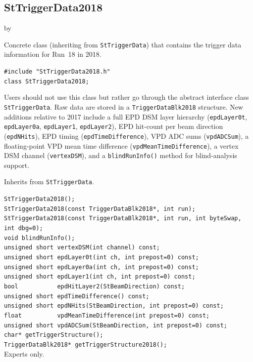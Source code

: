 \documentclass[twoside]{article}
\newcommand{\entrylabel}[1]{\mbox{\textbf{{#1}}}\hfil}%
\newenvironment{entry}
{\begin{list}{}%
    {\renewcommand{\makelabel}{\entrylabel}%
     \setlength{\labelwidth}{90pt}%
     \setlength{\leftmargin}{\labelwidth}
     \advance\leftmargin by \labelsep%
      }%
    }%
  {\end{list}}
\newcommand{\Entrylabel}[1]%
{\raisebox{0pt}[1ex][0pt]{\makebox[\labelwidth][l]%
    {\parbox[t]{\labelwidth}{\hspace{0pt}\textbf{{#1}}}}}}
\newenvironment{Entry}%
{\renewcommand{\entrylabel}{\Entrylabel}\begin{entry}}%
  {\end{entry}}
\begin{document}
\subsection{StTriggerData2018}
\label{sec:StTriggerData2018}
\begin{Entry}
\item[Summary] Concrete class (inheriting from \texttt{StTriggerData}) that
    contains the trigger data information for Run~18 in 2018.
\item[Synopsis]
    \verb+#include "StTriggerData2018.h"+\\
    \verb+class StTriggerData2018;+\\
\item[Description] Users should not use this class but rather go through the
    abstract interface class \texttt{StTriggerData}.  Raw data are stored in a
    \verb+TriggerDataBlk2018+ structure.  New additions relative to 2017 include
    a full EPD DSM layer hierarchy (\verb+epdLayer0t+, \verb+epdLayer0a+,
    \verb+epdLayer1+, \verb+epdLayer2+), EPD hit-count per beam direction
    (\verb+epdNHits+), EPD timing (\verb+epdTimeDifference+), VPD ADC sums
    (\verb+vpdADCSum+), a floating-point VPD mean time difference
    (\verb+vpdMeanTimeDifference+), a vertex DSM channel (\verb+vertexDSM+),
    and a \verb+blindRunInfo()+ method for blind-analysis support.
\item[Related Classes] Inherits from \texttt{StTriggerData}.
\item[Public\\ Constructors]
    \verb+StTriggerData2018();+\\
    \verb+StTriggerData2018(const TriggerDataBlk2018*, int run);+\\
    \verb+StTriggerData2018(const TriggerDataBlk2018*, int run, int byteSwap, int dbg=0);+\\
    \verb+void blindRunInfo();+\\
    \verb+unsigned short vertexDSM(int channel) const;+\\
    \verb+unsigned short epdLayer0t(int ch, int prepost=0) const;+\\
    \verb+unsigned short epdLayer0a(int ch, int prepost=0) const;+\\
    \verb+unsigned short epdLayer1(int ch, int prepost=0) const;+\\
    \verb+bool           epdHitLayer2(StBeamDirection) const;+\\
    \verb+unsigned short epdTimeDifference() const;+\\
    \verb+unsigned short epdNHits(StBeamDirection, int prepost=0) const;+\\
    \verb+float          vpdMeanTimeDifference(int prepost=0) const;+\\
    \verb+unsigned short vpdADCSum(StBeamDirection, int prepost=0) const;+\\
    \verb+char* getTriggerStructure();+\\
    \verb+TriggerDataBlk2018* getTriggerStructure2018();+\\
    Experts only.
\end{Entry}
\clearpage
\end{document}

